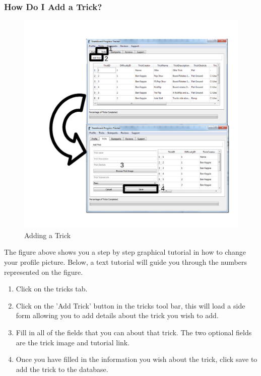 \subsubsection{How Do I Add a Trick?} \label{AddTrick}

\begin{figure}[H]
    \includegraphics[width=\textwidth]{./Manual/Images/AddTrick.pdf}
    \caption{Adding a Trick} \label{fig:Add Trick}
\end{figure}

The figure above shows you a step by step graphical tutorial in how to change your profile picture. Below, a text tutorial will guide you through the numbers represented on the figure.

\begin{enumerate}
\item Click on the tricks tab.
\item Click on the 'Add Trick' button in the tricks tool bar, this will load a side form allowing you to add details about the trick you wish to add.
\item Fill in all of the fields that you can about that trick. The two optional fields are the trick image and tutorial link.
\item Once you have filled in the information you wish about the trick, click save to add the trick to the database.
\end{enumerate}

